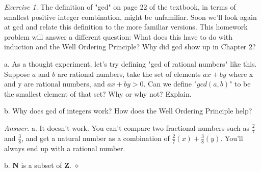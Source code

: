 \documentclass[12pt,oneside]{amsart}
\theoremstyle{remark}
\newtheorem{exer}{Exercise}
\newcommand{\bfN}{\mathbf{N}}
\newcommand{\bfZ}{\mathbf{Z}}
\newenvironment{answer}{\bigskip\noindent\emph{Answer.}}{\hfill$\diamond$\newline}
\begin{document}
\newpage
\begin{exer}
The definition of "gcd" on page 22 of the textbook, in terms of smallest positive integer combination, might be unfamiliar. Soon we’ll look again at gcd and relate this definition to the more familiar versions. This homework problem will answer a different question: What does this have to do with induction and the Well Ordering Principle? Why did gcd show up in Chapter 2?

a. As a thought experiment, let’s try defining "gcd of rational numbers" like this. Suppose $a$ and $b$ are rational numbers, take the set of elements $ax + by$ where x  and y are rational numbers, and $ax + by > 0$. Can we define "$gcd(a, b)$" to be the smallest element of that set? Why or why not? Explain.


b. Why does gcd of integers work? How does the Well Ordering Principle help?
\end{exer}



\begin{answer}
a. It doesn't work. You can't compare two fractional numbers such as $\frac{2}{7}$ and $\frac{3}{8}$, and get a natural number as a combination of $\frac{2}{7}(x) + \frac{3}{8}(y)$. You'll always end up with a rational number.

b. $\bfN$ is a subset of $\bfZ$.
\end{answer}
\end{document}
